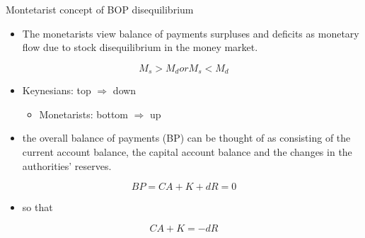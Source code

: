 \documentclass[10pt,hyperref={CJKbookmarks=true},xcolor=dvipsnames,aspectratio=169]{beamer}
\begin{document}
\begin{frame}{Montetarist concept of BOP disequilibrium}

\begin{itemize}
\item The monetarists view balance of payments surpluses and deficits as
monetary flow due to stock disequilibrium in the money market. 
\end{itemize}

\[
M_{s}>M_{d}orM_{s}<M_{d}
\]

\begin{itemize}
\item Keynesians: top $\Rightarrow$ down

\begin{itemize}
\item Monetarists: bottom $\Rightarrow$ up
\end{itemize}
\item the overall balance of payments (BP) can be thought of as consisting
of the current account balance, the capital account balance and the
changes in the authorities’ reserves.
\end{itemize}

\[
BP=CA+K+dR=0
\]

\begin{itemize}
\item so that
\end{itemize}

\[
CA+K=\text{−}dR
\]





\end{frame}
\end{document}
